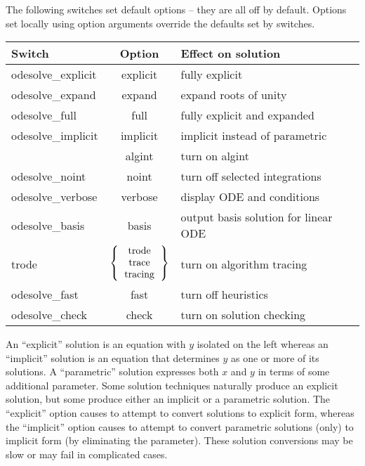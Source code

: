 The following switches set default options -- they are all off by
default.  Options set locally using option arguments override the
defaults set by switches.
\begin{center}
\begin{tabular}{lcl}
\bf Switch         & \bf Option  & \bf Effect on solution \\
\hline
odesolve\_explicit & explicit    & fully explicit \\
odesolve\_expand   & expand      & expand roots of unity \\
odesolve\_full     & full        & fully explicit and expanded \\
odesolve\_implicit & implicit    & implicit instead of parametric \\
                   & algint      & turn on algint \\
odesolve\_noint    & noint       & turn off selected integrations \\
odesolve\_verbose  & verbose     & display ODE and conditions \\
odesolve\_basis    & basis       & output basis solution for linear ODE \\
trode              & $\left\{\begin{tabular}{c}trode\\trace\\tracing\end{tabular}\right\}$
                                 & turn on algorithm tracing \\
odesolve\_fast     & fast        & turn off heuristics \\
odesolve\_check    & check       & turn on solution checking
\end{tabular}
\end{center}

An ``explicit'' solution is an equation with $y$ isolated on the left
whereas an ``implicit'' solution is an equation that determines $y$ as
one or more of its solutions.  A ``parametric'' solution expresses
both $x$ and $y$ in terms of some additional parameter.  Some solution
techniques naturally produce an explicit solution, but some produce
either an implicit or a parametric solution.  The ``explicit'' option
causes  to attempt to convert solutions to explicit form,
whereas the ``implicit'' option causes  to attempt to convert
parametric solutions (only) to implicit form (by eliminating the
parameter).  These solution conversions may be slow or may fail in
complicated cases.

